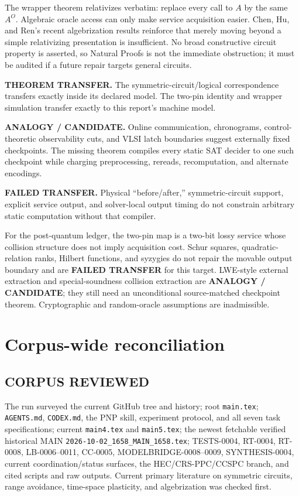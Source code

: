 \documentclass[11pt]{article}
\begin{document}
The wrapper theorem relativizes verbatim: replace every call to $A$ by the
same $A^O$.  Algebraic oracle access can only make service acquisition easier.
Chen, Hu, and Ren's recent algebrization results reinforce that merely moving
beyond a simple relativizing presentation is insufficient.  No broad
constructive circuit property is asserted, so Natural Proofs is not the
immediate obstruction; it must be audited if a future repair targets general
circuits.

\begin{description}[leftmargin=0cm,labelwidth=0cm]
\item[] \textbf{THEOREM TRANSFER.}
The symmetric-circuit/logical correspondence transfers exactly inside its
declared model.  The two-pin identity and wrapper simulation transfer exactly
to this report's machine model.
\item[] \textbf{ANALOGY / CANDIDATE.}
Online communication, chronograms, control-theoretic observability cuts, and
VLSI latch boundaries suggest externally fixed checkpoints.  The missing
theorem compiles every static SAT decider to one such checkpoint while
charging preprocessing, rereads, recomputation, and alternate encodings.
\item[] \textbf{FAILED TRANSFER.}
Physical ``before/after,'' symmetric-circuit support, explicit service output,
and solver-local output timing do not constrain arbitrary static computation
without that compiler.
\end{description}

For the post-quantum ledger, the two-pin map is a two-bit lossy service whose
collision structure does not imply acquisition cost.  Schur squares,
quadratic-relation ranks, Hilbert functions, and syzygies do not repair the
movable output boundary and are \textbf{FAILED TRANSFER} for this target.
LWE-style external extraction and special-soundness collision extraction are
\textbf{ANALOGY / CANDIDATE}; they still need an unconditional source-matched
checkpoint theorem.  Cryptographic and random-oracle assumptions are
inadmissible.

\section{Corpus-wide reconciliation}

\subsection*{CORPUS REVIEWED}
The run surveyed the current GitHub tree and history; root \texttt{main.tex};
\texttt{AGENTS.md}, \texttt{CODEX.md}, the PNP skill, experiment protocol,
and all seven task specifications; current \texttt{main4.tex} and
\texttt{main5.tex}; the newest fetchable verified historical MAIN
\texttt{2026-10-02\_1658\_MAIN\_1658.tex}; TESTS-0004, RT-0004, RT-0008,
LB-0006--0011, CC-0005, MODELBRIDGE-0008--0009, SYNTHESIS-0004, current
coordination/status surfaces, the HEC/CRS-PPC/CCSPC branch, and cited scripts
and raw outputs.  Current primary literature on symmetric circuits,
range avoidance, time-space plasticity, and algebrization was checked first.
\end{document}
